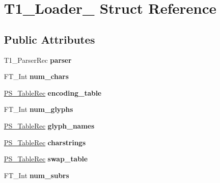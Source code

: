 \hypertarget{struct_t1___loader__}{}\section{T1\+\_\+\+Loader\+\_\+ Struct Reference}
\label{struct_t1___loader__}
\subsection*{Public Attributes}
\begin{DoxyCompactItemize}
\item 
\mbox{\label{struct_t1___loader___aaeee4b6a6ec9ebb17751a6b399b080f8}} 
T1\+\_\+\+Parser\+Rec {\bfseries parser}
\item 
\mbox{\label{struct_t1___loader___a9504ee6d94ef38317bab6fe14eb83ffb}} 
F\+T\+\_\+\+Int {\bfseries num\+\_\+chars}
\item 
\mbox{\label{struct_t1___loader___a01b323c7f6f64fd5e615173eec9549cc}} 
\hyperlink{struct_p_s___table_rec__}{P\+S\+\_\+\+Table\+Rec} {\bfseries encoding\+\_\+table}
\item 
\mbox{\label{struct_t1___loader___a4a11a9719ba52683b6ffcfa770e256f6}} 
F\+T\+\_\+\+Int {\bfseries num\+\_\+glyphs}
\item 
\mbox{\label{struct_t1___loader___a7a5738470e28452a9c0d5ef852cd1c90}} 
\hyperlink{struct_p_s___table_rec__}{P\+S\+\_\+\+Table\+Rec} {\bfseries glyph\+\_\+names}
\item 
\mbox{\label{struct_t1___loader___ad98e85bd916225aed76e32c7068b7230}} 
\hyperlink{struct_p_s___table_rec__}{P\+S\+\_\+\+Table\+Rec} {\bfseries charstrings}
\item 
\mbox{\label{struct_t1___loader___a48f62b8c377bc70304e29a9ccd95eb36}} 
\hyperlink{struct_p_s___table_rec__}{P\+S\+\_\+\+Table\+Rec} {\bfseries swap\+\_\+table}
\item 
\mbox{\label{struct_t1___loader___a112eebfd6a91514675dd416cc96b047f}} 
F\+T\+\_\+\+Int {\bfseries num\+\_\+subrs}

\end{DoxyCompactItemize}
